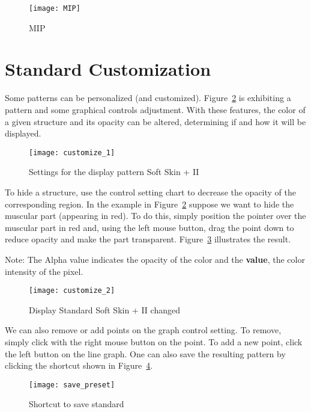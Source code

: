 \begin{figure}[!htb]
\centering
\texttt{[image: MIP]}
\caption{MIP}
\label{fig:MIP}
\end{figure}

\newpage

\section{Standard Customization}

Some patterns can be personalized (and customized). Figure~\ref{fig:customize_1} is exhibiting a pattern and some graphical controls adjustment. With these features, the color of a given structure and its opacity can be altered, determining if and how it will be displayed.

\begin{figure}[!htb]
\centering
\texttt{[image: customize\_1]}
\caption{Settings for the display pattern Soft Skin + II}
\label{fig:customize_1}
\end{figure}


\newpage

To hide a structure, use the control setting chart to decrease the opacity of the corresponding region. In the example in Figure~\ref{fig:customize_1} suppose we want to hide the muscular part (appearing in red). To do this, simply position the pointer over the muscular part in red and, using the left mouse button, drag the point down to reduce opacity and make the part transparent. Figure~\ref{fig:customize_2} illustrates the result.

Note: The Alpha value indicates the opacity of the color and the \textbf{value}, the color intensity of the pixel.

\begin{figure}[!htb]
\centering
\texttt{[image: customize\_2]}
\caption{Display Standard Soft Skin + II changed}
\label{fig:customize_2}
\end{figure}


\newpage

We can also remove or add points on the graph control setting. To remove, simply click with the right mouse button on the point. To add a new point, click the left button on the line graph. One can also save the resulting pattern by clicking the shortcut shown in Figure~\ref{fig:save_preset}.

\begin{figure}[!htb]
\centering
\texttt{[image: save\_preset]}
\caption{Shortcut to save standard}
\label{fig:save_preset}
\end{figure}
 

